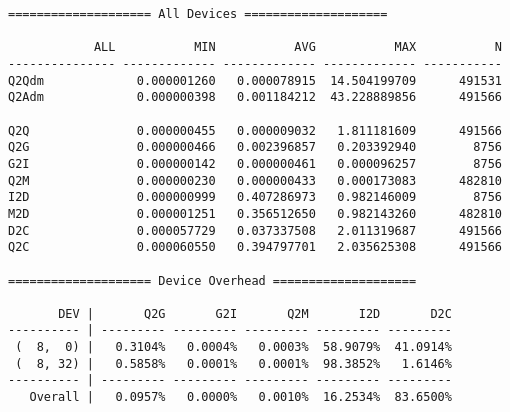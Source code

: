 \begin{verbatim}
==================== All Devices ====================

            ALL           MIN           AVG           MAX           N
--------------- ------------- ------------- ------------- -----------
Q2Qdm             0.000001260   0.000078915  14.504199709      491531
Q2Adm             0.000000398   0.001184212  43.228889856      491566

Q2Q               0.000000455   0.000009032   1.811181609      491566
Q2G               0.000000466   0.002396857   0.203392940        8756
G2I               0.000000142   0.000000461   0.000096257        8756
Q2M               0.000000230   0.000000433   0.000173083      482810
I2D               0.000000999   0.407286973   0.982146009        8756
M2D               0.000001251   0.356512650   0.982143260      482810
D2C               0.000057729   0.037337508   2.011319687      491566
Q2C               0.000060550   0.394797701   2.035625308      491566

==================== Device Overhead ====================

       DEV |       Q2G       G2I       Q2M       I2D       D2C
---------- | --------- --------- --------- --------- ---------
 (  8,  0) |   0.3104%   0.0004%   0.0003%  58.9079%  41.0914%
 (  8, 32) |   0.5858%   0.0001%   0.0001%  98.3852%   1.6146%
---------- | --------- --------- --------- --------- ---------
   Overall |   0.0957%   0.0000%   0.0010%  16.2534%  83.6500%

\end{verbatim}
\newpage
